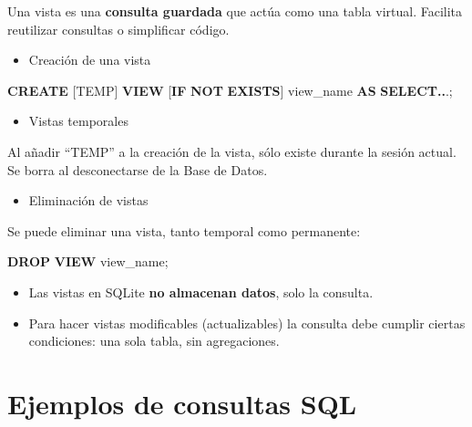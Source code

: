 \documentclass[
]{book}
\newenvironment{Shaded}{\begin{snugshade}}{\end{snugshade}}
\newcommand{\ControlFlowTok}[1]{\textcolor[rgb]{0.13,0.29,0.53}{\textbf{#1}}}
\newcommand{\KeywordTok}[1]{\textcolor[rgb]{0.13,0.29,0.53}{\textbf{#1}}}
\newcommand{\NormalTok}[1]{#1}
\newcommand{\OperatorTok}[1]{\textcolor[rgb]{0.81,0.36,0.00}{\textbf{#1}}}
\providecommand{\tightlist}{%
  \setlength{\itemsep}{0pt}\setlength{\parskip}{0pt}}
\theoremstyle{break}
\theoremstyle{nonumberplain}
\begin{document}
Una vista es una \textbf{consulta guardada} que actúa como una tabla virtual. Facilita reutilizar consultas o simplificar código.

\begin{itemize}
\tightlist
\item
  Creación de una vista
\end{itemize}

\begin{Shaded}
\begin{Highlighting}[]
\KeywordTok{CREATE}\NormalTok{ [TEMP] }\KeywordTok{VIEW}\NormalTok{ [}\ControlFlowTok{IF} \KeywordTok{NOT} \KeywordTok{EXISTS}\NormalTok{] view\_name }\KeywordTok{AS}
    \KeywordTok{SELECT}\OperatorTok{..}\NormalTok{.;}
\end{Highlighting}
\end{Shaded}

\begin{itemize}
\tightlist
\item
  Vistas temporales
\end{itemize}

Al añadir ``TEMP'' a la creación de la vista, sólo existe durante la sesión actual.
Se borra al desconectarse de la Base de Datos.

\begin{itemize}
\tightlist
\item
  Eliminación de vistas
\end{itemize}

Se puede eliminar una vista, tanto temporal como permanente:

\begin{Shaded}
\begin{Highlighting}[]
\KeywordTok{DROP} \KeywordTok{VIEW}\NormalTok{ view\_name;}
\end{Highlighting}
\end{Shaded}

\begin{itemize}
\tightlist
\item
  Las vistas en SQLite \textbf{no almacenan datos}, solo la consulta.
\item
  Para hacer vistas modificables (actualizables) la consulta debe cumplir ciertas condiciones: una sola tabla, sin agregaciones.
\end{itemize}

\section{Ejemplos de consultas SQL}\label{ejemplos-de-consultas-sql}
\end{document}
